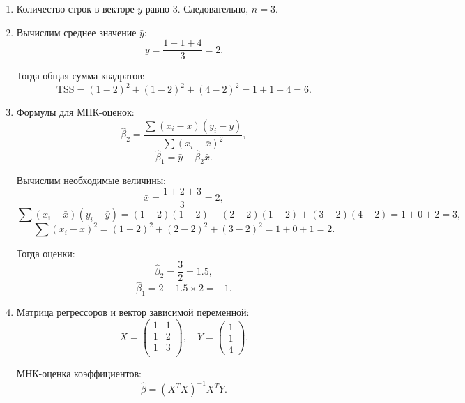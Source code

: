 \documentclass[12pt]{article}
\begin{document}
\begin{sol}
\begin{enumerate}
    \item Количество строк в векторе $y$ равно 3. Следовательно, $n=3$.
    
    \item Вычислим среднее значение $\bar{y}$:
    \[
    \bar{y} = \frac{1 + 1 + 4}{3} = 2.
    \]
    
    Тогда общая сумма квадратов:
    \[
    \text{TSS} = (1-2)^2 + (1-2)^2 + (4-2)^2 = 1 + 1 + 4 = 6.
    \]
    
    \item Формулы для МНК-оценок:
    \[
    \hat{\beta}_2 = \frac{\sum (x_i - \bar{x})(y_i - \bar{y})}{\sum (x_i - \bar{x})^2},
    \]
    \[
    \hat{\beta}_1 = \bar{y} - \hat{\beta}_2 \bar{x}.
    \]
    
    Вычислим необходимые величины:
    \[
    \bar{x} = \frac{1 + 2 + 3}{3} = 2,
    \]
    \[
    \sum (x_i - \bar{x})(y_i - \bar{y}) = (1-2)(1-2) + (2-2)(1-2) + (3-2)(4-2) = 1 + 0 + 2 = 3,
    \]
    \[
    \sum (x_i - \bar{x})^2 = (1-2)^2 + (2-2)^2 + (3-2)^2 = 1 + 0 + 1 = 2.
    \]
    
    Тогда оценки:
    \[
    \hat{\beta}_2 = \frac{3}{2} = 1.5,
    \]
    \[
    \hat{\beta}_1 = 2 - 1.5 \times 2 = -1.
    \]
    
    \item Матрица регрессоров и вектор зависимой переменной:
    \[
    X = \begin{pmatrix}
    1 & 1 \\
    1 & 2 \\
    1 & 3 \\
    \end{pmatrix}, \quad
    Y = \begin{pmatrix} 1 \\ 1 \\ 4 \end{pmatrix}.
    \]
    
    МНК-оценка коэффициентов:
    \[
    \hat{\beta} = (X^T X)^{-1} X^T Y.
    \]
    

\end{enumerate}
\end{sol}
\end{document}
